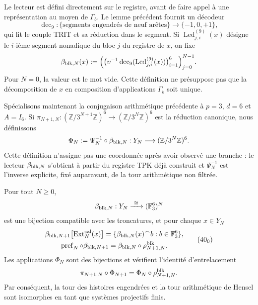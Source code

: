 Le lecteur est défini directement sur le registre, avant de faire appel à une représentation au moyen de \(\Gamma_b\). Le lemme précédent fournit un décodeur
\[
 \operatorname{dec}_9:\{\text{segments engendrés de neuf arêtes}\}
 \longrightarrow\{-1,0,+1\},
\]
qui lit le couple TRIT et sa réduction dans le segment. Si
\(\operatorname{Led}^{(9)}_{j,i}(x)\) désigne le \(i\)-ième segment nonadique
du bloc \(j\) du registre de \(x\), on fixe
\begin{equation}
 \beta_{{\rm blk},N}(x):=
 \Bigl(
   \bigl(\upsilon^{-1}\operatorname{dec}_9
          (\operatorname{Led}^{(9)}_{j,i}(x))\bigr)_{i=1}^{6}
 \Bigr)_{j=0}^{N-1}.
 \label{eq:lector-bloques-ch}
\end{equation}
Pour \(N=0\), la valeur est le mot vide. Cette définition ne présuppose pas que la décomposition de \(x\) en composition d'applications \(\Gamma_b\) soit unique.

Spécialisons maintenant la conjugaison arithmétique précédente à
\(p=3\), \(d=6\) et \(A=I_6\). Si
\(\pi_{N+1,N}:(\mathbb Z/3^{N+1}\mathbb Z)^6\to
(\mathbb Z/3^N\mathbb Z)^6\) est la réduction canonique, nous définissons
\begin{equation}
 \Phi_N:=\Psi_N^{-1}\circ\beta_{{\rm blk},N}:
 Y_N\longrightarrow(\mathbb Z/3^N\mathbb Z)^6.
 \label{eq:phi-hensel-bloques-ch}
\end{equation}
Cette définition n’assigne pas une coordonnée après avoir observé une branche : le
lecteur \(\beta_{{\rm blk},N}\) s’obtient à partir du registre TPK déjà construit et
\(\Psi_N^{-1}\) est l’inverse explicite, fixé auparavant, de la tour
arithmétique non filtrée.

\begin{proposition}
\label{prop:cobertura-729-seccion}
Pour tout \(N\geq0\),
\[
 \beta_{{\rm blk},N}:Y_N\xrightarrow{\ \cong\ }
 (\mathbb F_3^6)^N
\]
est une bijection compatible avec les troncatures, et pour chaque \(x\in Y_N\)
\[
 \begin{gathered}
 \beta_{{\rm blk},N+1}
 \bigl[\operatorname{Ext}^{\rm cal}_N(x)\bigr]
 =\{\beta_{{\rm blk},N}(x)^\frown b:
       b\in\mathbb F_3^6\},\\
 \operatorname{pref}_N\circ\beta_{{\rm blk},N+1}
 =\beta_{{\rm blk},N}\circ\rho^{\rm blk}_{N+1,N}.
 \end{gathered}
\tag{40$_0$}
\label{eq:cobertura-729-ch}
\]
Les applications \(\Phi_N\) sont des bijections et vérifient l’identité
d’entrelacement
\begin{equation}
 \pi_{N+1,N}\circ\Phi_{N+1}
 =\Phi_N\circ\rho^{\rm blk}_{N+1,N}.
 \label{eq:entrelazamiento-hensel-ext-ch}
\end{equation}
Par conséquent, la tour des histoires engendrées et la tour arithmétique de Hensel sont isomorphes en tant que systèmes projectifs finis.
\end{proposition}

